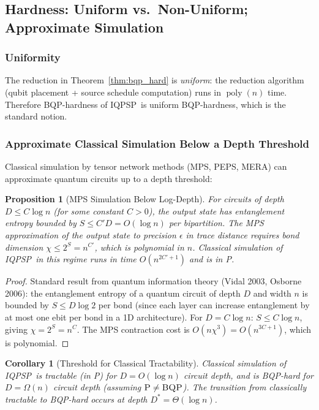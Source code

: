 \documentclass[11pt]{article}
\newtheorem{proposition}[theorem]{Proposition}
\newtheorem{corollary}[theorem]{Corollary}
\theoremstyle{definition}
\theoremstyle{remark}
\newcommand{\BQP}{\textsc{BQP}}
\newcommand{\PP}{\textsc{P}}
\newcommand{\IQPSP}{\textsc{IQPSP}}
\DeclareMathOperator{\poly}{poly}
\begin{document}
\subsection{Hardness: Uniform vs.\ Non-Uniform; Approximate Simulation}
\label{sec:uniform_hardness}

\subsubsection{Uniformity}

The reduction in Theorem~\ref{thm:bqp_hard} is \emph{uniform}: the
reduction algorithm (qubit placement + source schedule computation) runs
in $\poly(n)$ time. Therefore BQP-hardness of \IQPSP\ is uniform BQP-hardness,
which is the standard notion.

\subsubsection{Approximate Classical Simulation Below a Depth Threshold}

Classical simulation by tensor network methods (MPS, PEPS, MERA) can
approximate quantum circuits up to a depth threshold:

\begin{proposition}[MPS Simulation Below Log-Depth]
\label{prop:mps}
For circuits of depth $D \leq C \log n$ (for some constant $C > 0$),
the output state has entanglement entropy bounded by
$S \leq C' D = O(\log n)$ per bipartition. The MPS approximation of
the output state to precision $\epsilon$ in trace distance requires
bond dimension $\chi \leq 2^S = n^{C'}$, which is polynomial in $n$.
Classical simulation of \IQPSP\ in this regime runs in time $O(n^{2C'+1})$
and is in \PP.
\end{proposition}

\begin{proof}
Standard result from quantum information theory (Vidal 2003, Osborne 2006):
the entanglement entropy of a quantum circuit of depth $D$ and width $n$
is bounded by $S \leq D \log 2$ per bond (since each layer can increase
entanglement by at most one ebit per bond in a 1D architecture).
For $D = C\log n$: $S \leq C\log n$, giving $\chi = 2^S = n^C$. The
MPS contraction cost is $O(n \chi^3) = O(n^{3C+1})$, which is polynomial.
\end{proof}

\begin{corollary}[Threshold for Classical Tractability]
\label{cor:threshold}
Classical simulation of \IQPSP\ is tractable (in \PP) for
$D = O(\log n)$ circuit depth, and is BQP-hard for $D = \Omega(n)$
circuit depth (assuming $\PP \neq \BQP$). The transition from classically
tractable to BQP-hard occurs at depth $D^* = \Theta(\log n)$.
\end{corollary}
\end{document}
